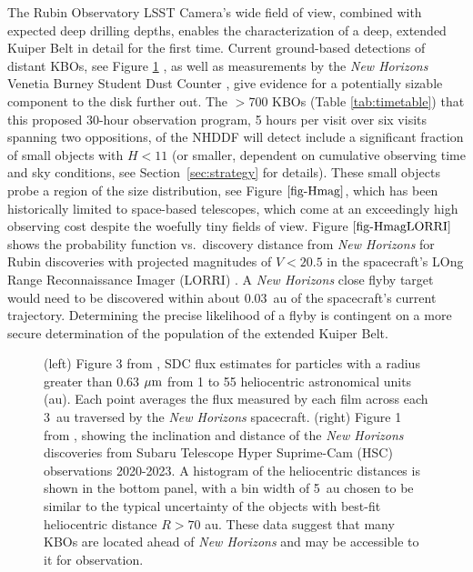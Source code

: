 \documentclass[modern,preprint]{aastex7}
\begin{document}
The Rubin Observatory LSST Camera's wide field of view, combined with expected deep drilling depths, enables the characterization of a deep, extended Kuiper Belt in detail for the first time. Current ground-based detections of distant KBOs, see Figure \ref{fig-KBOsPlot} \citep{Fraser2024LPI, Yoshida2024}, as well as measurements by the {\it New Horizons} Venetia Burney Student Dust Counter \citep[SDC,][]{Doner2024}, give evidence for a potentially sizable component to the disk further out. 
The $>$700 KBOs (Table \ref{tab:timetable}) that this proposed 30-hour observation program, 5 hours per visit over six visits spanning two oppositions, of the NHDDF will detect include a significant fraction of small objects with $H<11$ (or smaller, dependent on cumulative observing time and sky conditions, see Section~\ref{sec:strategy} for details).
These small objects probe a region of the size distribution, see Figure $\ref{fig-Hmag}$, which has been historically limited to space-based telescopes, which come at an exceedingly high observing cost despite the woefully tiny fields of view.  
Figure $\ref{fig-HmagLORRI}$ shows the probability function vs.\ discovery distance from {\it New Horizons} for Rubin discoveries with projected magnitudes of $V<20.5$ in the spacecraft's LOng Range Reconnaissance Imager (LORRI) \citep{2008SSRv..140..189C,2020PASP..132c5003W}. A \textit{New Horizons} close flyby target would need to be discovered within about 0.03~au of the spacecraft's current trajectory. Determining the precise likelihood of a flyby is contingent on a more secure determination of the population of the extended Kuiper Belt.

\begin{figure}
\caption{\label{fig-KBOsPlot}(left) Figure 3 from \citet[][used with permission]{Doner2024}, SDC flux estimates for particles with a radius greater than 0.63 $\mbox{$\mu$m} $ from 1 to 55 heliocentric astronomical units (au). Each point averages the flux measured by each film across each 3~au traversed by the {\it New Horizons} spacecraft. (right) Figure 1 from \citet[][used with permission]{Fraser2024LPI}, showing the inclination and distance of the {\it New Horizons} discoveries from Subaru Telescope Hyper Suprime-Cam (HSC) observations 2020-2023. A histogram of the heliocentric distances is shown in the bottom panel, with a bin width of 5~au chosen to be similar to the typical uncertainty of the objects with best-fit heliocentric distance $R > 70$ au. These data suggest that many KBOs are located ahead of {\it New Horizons} and may be accessible to it for observation.}

\end{figure}
\end{document}
